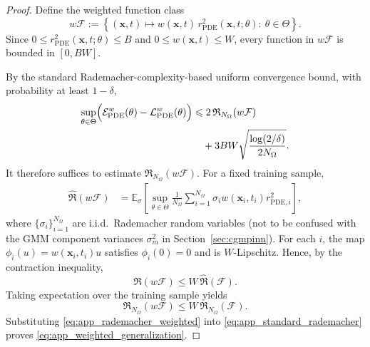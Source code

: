 \documentclass{article}
\theoremstyle{plain}
\theoremstyle{definition}
\theoremstyle{remark}
\begin{document}
\begin{proof}
	Define the weighted function class
	\begin{equation}
		w\mathcal{F}
		:=
		\left\{
		(\boldsymbol{x},t)\mapsto
		w(\boldsymbol{x},t)\,
		r_{\mathrm{PDE}}^2(\boldsymbol{x},t;\theta)
		:\ \theta\in\Theta
		\right\}.
		\label{eq:app_weighted_function_class}
	\end{equation}
	Since
	$0\leqslant r_{\mathrm{PDE}}^2(\boldsymbol{x},t;\theta)\leqslant B$
	and
	$0\leqslant w(\boldsymbol{x},t)\leqslant W$,
	every function in $w\mathcal{F}$ is bounded in $[0,BW]$.
	
	By the standard Rademacher-complexity-based uniform convergence bound,
	with probability at least $1-\delta$,
	\begin{equation}
		\begin{split}
			\sup_{\theta\in\Theta}
			\Bigl(
			\mathcal{E}_{\mathrm{PDE}}^{w}(\theta)
			-
			\mathcal{L}_{\mathrm{PDE}}^{w}(\theta)
			\Bigr)
			&\leqslant
			2\,\mathfrak{R}_{N_{\Omega}}(w\mathcal{F}) \\
			&\quad
			+
			3BW\sqrt{\frac{\log(2/\delta)}{2N_{\Omega}}}.
		\end{split}
		\label{eq:app_standard_rademacher}
	\end{equation}
	It therefore suffices to estimate
	$\mathfrak{R}_{N_{\Omega}}(w\mathcal{F})$.
	For a fixed training sample,
	\begin{align}
		\widehat{\mathfrak{R}}(w\mathcal{F})
		&=
		\mathbb{E}_{\sigma}
		\left[
		\sup_{\theta\in\Theta}
		\frac{1}{N_{\Omega}}
		\sum_{i=1}^{N_{\Omega}}
		\sigma_i
		w(\boldsymbol{x}_i,t_i)
		r_{\mathrm{PDE},i}^{2}
		\right],
		\label{eq:app_empirical_rademacher}
	\end{align}
	where $\{\sigma_i\}_{i=1}^{N_{\Omega}}$ are i.i.d.\ Rademacher random
	variables (not to be confused with the GMM component variances
	$\sigma_m^2$ in Section~\ref{sec:cgmpinn}).
	For each $i$, the map
	$\phi_i(u)=w(\boldsymbol{x}_i,t_i)u$
	satisfies $\phi_i(0)=0$ and is $W$-Lipschitz.
	Hence, by the contraction inequality,
	\begin{equation}
		\widehat{\mathfrak{R}}(w\mathcal{F})
		\leqslant
		W\,\widehat{\mathfrak{R}}(\mathcal{F}).
		\label{eq:app_contraction}
	\end{equation}
	Taking expectation over the training sample yields
	\begin{equation}
		\mathfrak{R}_{N_{\Omega}}(w\mathcal{F})
		\leqslant
		W\,\mathfrak{R}_{N_{\Omega}}(\mathcal{F}).
		\label{eq:app_rademacher_weighted}
	\end{equation}
	Substituting \eqref{eq:app_rademacher_weighted} into
	\eqref{eq:app_standard_rademacher} proves
	\eqref{eq:app_weighted_generalization}.
\end{proof}
\end{document}
